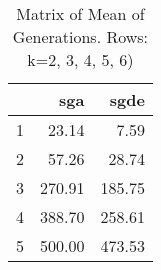 \begin{table}[ht]
\centering
\begin{tabular}{rrr}
  \hline
 & sga & sgde \\ 
  \hline
1 & 23.14 & 7.59 \\ 
  2 & 57.26 & 28.74 \\ 
  3 & 270.91 & 185.75 \\ 
  4 & 388.70 & 258.61 \\ 
  5 & 500.00 & 473.53 \\ 
   \hline
\end{tabular}
\caption{Matrix of Mean of Generations.  Rows: k=2, 3, 4, 5, 6)} 
\end{table}
